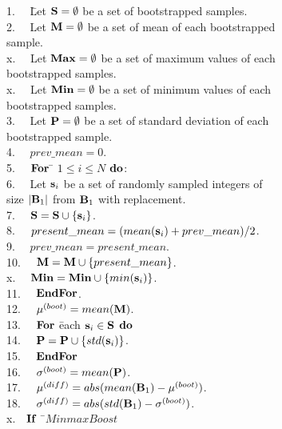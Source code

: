 \documentclass[lettersize,journal]{IEEEtran}
\begin{document}
\begin{tabbing}
1.~~ \= Let ${\bf S} = \emptyset$ be a set of bootstrapped samples. \\
2.~~ \> Let ${\bf M} = \emptyset$ be a set of mean of each bootstrapped \\
     \> sample. \\
x.~~ \> Let ${\bf Max} = \emptyset$ be a set of maximum values of each \\
\> bootstrapped samples. \\
x.~~ \> Let ${\bf Min} = \emptyset$ be a set of minimum values of each \\
\> bootstrapped samples. \\
3.~~ \> Let ${\bf P} = \emptyset$ be a set of standard deviation of each \\
     \> bootstrapped sample. \\
4.~~ \> $prev\_mean = 0$. \\
5.~~ \> ${\bf For}$ \= $1 \leq i \leq N$ ${\bf do}$: \\
6.~~ \>             \> Let ${\bf s}_{i}$ be a set of randomly sampled integers of \\
     \>             \> size $|{\bf B}_{1}|$ from ${\bf B}_{1}$ with replacement. \\
7.~~ \>             \> ${\bf S} = {\bf S} \cup \{{\bf s}_{i}\}$. \\
8.~~ \>             \> $present\_mean = (mean({\bf s}_{i}) + prev\_mean)/2$. \\
9.~~ \>             \> $prev\_mean = present\_mean$. \\
10.~~\>             \> ${\bf M} = {\bf M} \cup \{present\_mean\}$. \\
x.~~\>             \> ${\bf Min} = {\bf Min} \cup \{min({\bf s}_i)\}$. \\
11.~~\> ${\bf EndFor}$. \\
12.~~\> $\mu^{(boot)} = mean({\bf M})$. \\
13.~~\> ${\bf For}$ \= each ${\bf s}_{i} \in {\bf S}$ ${\bf do}$ \\
14.~~\>             \> ${\bf P} = {\bf P} \cup \{std({\bf s}_{i})\}$. \\
15.~~\> ${\bf EndFor}$ \\
16.~~\> $\sigma^{(boot)} = mean({\bf P})$. \\
17.~~\> $\mu^{(diff)} = abs(mean({\bf B}_{1}) - \mu^{(boot)})$. \\
18.~~\> $\sigma^{(diff)} = abs(std({\bf B}_{1}) - \sigma^{(boot)})$. \\
x.~~\>${\bf If}$ \,\=\,$MinmaxBoost$\\

\end{tabbing}
\end{document}
